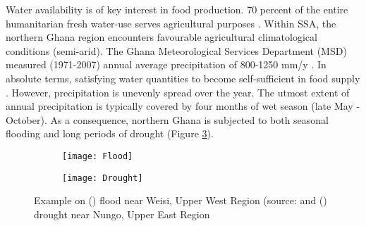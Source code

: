 Water availability is of key interest in food production. 70 percent of the entire humanitarian fresh water-use serves agricultural purposes \citep{UnitedNations2014}. Within SSA, the northern Ghana region encounters favourable agricultural climatological conditions (semi-arid). The Ghana Meteorological Services Department (MSD) measured (1971-2007) annual average precipitation of 800-1250 mm/y \citep{HAP2011}. In absolute terms, satisfying water quantities to become self-sufficient in food supply \citep{MinistryofForeignAffairs2018}. However, precipitation is unevenly spread over the year. The utmost extent of annual precipitation is typically covered by four months of wet season (late May - October). As a consequence, northern Ghana is subjected to both seasonal flooding and long periods of drought (Figure \ref{fig:Flood_Drought}). \\
%
%
%
%

\begin{figure}[h!]
	\centering
	\begin{subfigure}[b]{0.5\linewidth}
		\centering\texttt{[image: Flood]}
		\captionsetup{justification=centering}		
		\caption{\label{fig:Flood}}
		\end{subfigure}%
	\begin{subfigure}[b]{0.5\linewidth}
        \centering\texttt{[image: Drought]}
		\captionsetup{justification=centering}		
		\caption{\label{fig:Drought}}
		\end{subfigure}
		\captionsetup{justification=centering}	
	\caption[Example on () flood near Weisi, Upper West Region and () drought near Nungo, Upper East Region]{Example on () flood near Weisi, Upper West Region (source: \citep{Owusu2017} and () drought near Nungo, Upper East Region} 
	\label{fig:Flood_Drought}
\end{figure}

